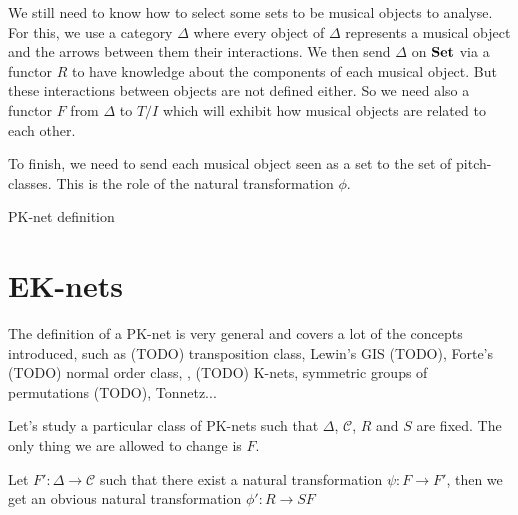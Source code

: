 \documentclass{report}
\begin{document}
We still need to know how to select some sets to be musical objects to analyse. For this, we use a category $\Delta$ where every object of $\Delta$ represents a musical object and the arrows between them their interactions. We then send  $\Delta$ on $\bf Set$ via a functor $R$ to have knowledge about the components of each musical object. But these interactions between objects are not defined either. So we need also a functor $F$ from $\Delta$ to $T/I$ which will exhibit how musical objects are related to each other.

To finish, we need to send each musical object seen as a set to the set of pitch-classes. This is the role of the natural transformation $\phi$.

\begin{tzcategory}{\caption{PK-net definition}}
\end{tzcategory}





\chapter{EK-nets}


The definition of a PK-net is very general and covers a lot of the concepts introduced, such as (TODO) transposition class, Lewin's GIS (TODO), Forte's (TODO) normal order class, , (TODO) K-nets, symmetric groups of permutations (TODO), Tonnetz...

Let's study a particular class of PK-nets such that $\Delta$, $\mathcal{C}$, $R$ and $S$ are fixed. The only thing we are allowed to change is $F$.

\begin{prop}
    Let $F' : \Delta \rightarrow \mathcal{C}$ such that there exist a natural transformation $\psi : F \rightarrow F'$, then we get an obvious natural transformation $\phi' : R \rightarrow SF$
\end{prop}
\end{document}
